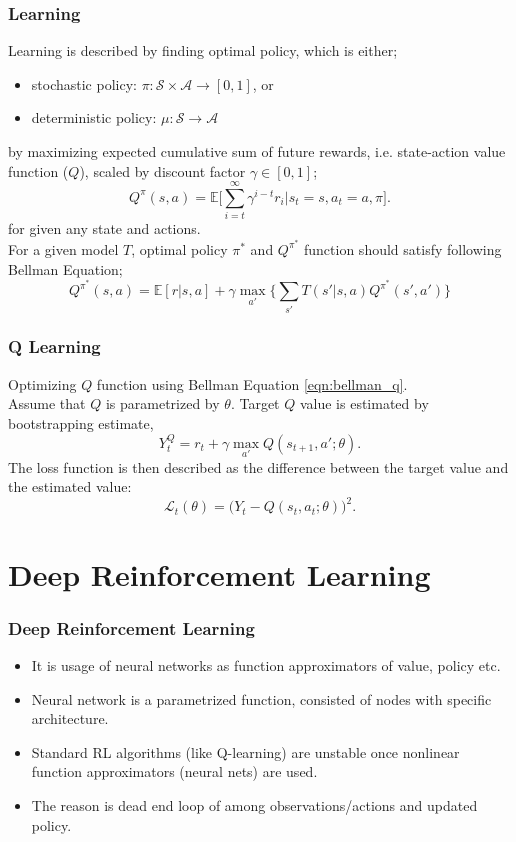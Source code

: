 \documentclass{beamer}
\begin{document}
\begin{frame}
\frametitle{Learning}
Learning is described by finding optimal policy, which is either;
\begin{itemize}
	\item stochastic policy: $\pi: \mathcal{S}\times\mathcal{A} \rightarrow [0,1]$, or
	\item deterministic policy: $\mu: \mathcal{S}\rightarrow\mathcal{A}$
\end{itemize}
by maximizing expected cumulative sum of future rewards, i.e. state-action value function ($Q$), scaled by discount factor $\gamma \in [0,1]$;
\begin{equation}
Q^{\pi}(s,a) = \mathbb{E}\bigg[\sum_{i=t}^{\infty} \gamma^{i-t} r_i|s_t=s, a_t=a, \pi\bigg]. %
\end{equation}
for given any state and actions. \\
For a given model $T$, optimal policy $\pi^*$ and $Q^{\pi^*}$ function should satisfy following Bellman Equation;
\begin{equation}
\label{eqn:bellman_q}
Q^{\pi^*}(s,a) = \mathbb{E}[r|s,a] + \gamma \max_{a'} \Big\{ \sum_{s'} T(s'|s,a) Q^{\pi^*}(s',a') \Big\}
\end{equation}
\end{frame}

\begin{frame}
\frametitle{Q Learning}
Optimizing $Q$ function using Bellman Equation \ref{eqn:bellman_q}.\\
Assume that $Q$ is parametrized by $\theta$.
Target $Q$ value is estimated by bootstrapping estimate, 
\begin{equation}
\label{eqn:q_target}
Y_t^Q = r_t + \gamma \max_{a'} Q(s_{t+1},a';\theta).
\end{equation}
The loss function is then described as the difference between the target value and the estimated value:
\begin{equation}
\label{eqn:q_loss}
\mathcal{L}_t(\theta) = \big( Y_t - Q(s_t,a_t;\theta) \big) ^ 2.
\end{equation}
\end{frame}


\section{Deep Reinforcement Learning}
\begin{frame}
\frametitle{Deep Reinforcement Learning}
\begin{itemize}
	\item It is usage of neural networks as function approximators of value, policy etc.
	\item Neural network is a parametrized function, consisted of nodes with specific architecture. 
	\item Standard RL algorithms (like Q-learning) are unstable once nonlinear function approximators (neural nets) are used. 
	\item The reason is dead end loop of among observations/actions and updated policy.
\end{itemize}
\end{frame}
\end{document}
